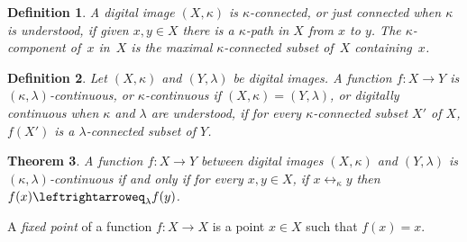 \documentclass{article}
\newtheorem{thm}{Theorem}
\newtheorem{remarks}[thm]{Remark}
\newtheorem{definition}[thm]{Definition}
\numberwithin{thm}{section}
\newcommand{\adj}{\leftrightarrow}
\newcommand{\adjeq}{\leftrightarroweq}
\DeclareMathOperator{\id}{id}
\DeclareMathOperator{\Fix}{Fix}
\def\Z{{\mathbb Z}}
\begin{document}
\begin{definition}
{\rm \cite{Rosenfeld}}
A digital image $(X,\kappa)$ is
{\em $\kappa$-connected}, or just {\em connected} when
$\kappa$ is understood, if given $x,y \in X$ there
is a $\kappa$-path in $X$ from $x$ to $y$. The {\rm $\kappa$-component of~$x$ in~$X$} is the
maximal $\kappa$-connected subset
of~$X$ containing~$x$.
\end{definition}

\begin{definition}
{\rm \cite{Rosenfeld, Bx99}}
Let $(X,\kappa)$ and $(Y,\lambda)$ be digital
images. A function $f: X \to Y$ is 
{\em $(\kappa,\lambda)$-continuous}, or
{\em $\kappa$-continuous} if $(X,\kappa)=(Y,\lambda)$, or
{\em digitally continuous} when $\kappa$ and
$\lambda$ are understood, if for every
$\kappa$-connected subset $X'$ of $X$,
$f(X')$ is a $\lambda$-connected subset of $Y$.
\end{definition}

\begin{thm}
{\rm \cite{Bx99}}
A function $f: X \to Y$ between digital images
$(X,\kappa)$ and $(Y,\lambda)$ is
$(\kappa,\lambda)$-continuous if and only if for
every $x,y \in X$, if $x \adj_{\kappa} y$ then
$f(x) \adjeq_{\lambda} f(y)$.
\end{thm}

A {\em fixed point} of a function $f: X \to X$ 
is a point $x \in X$ such that $f(x) = x$. 
\end{document}
